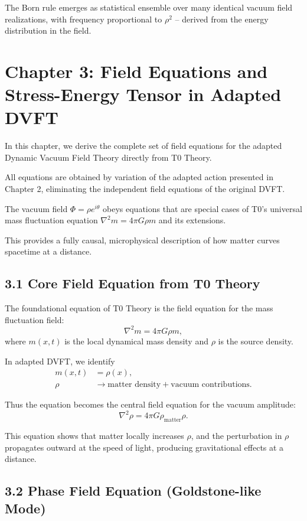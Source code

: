 	The Born rule emerges as statistical ensemble over many identical vacuum field realizations, with frequency proportional to $\rho^2$ – derived from the energy distribution in the field.
	
	\section{Chapter 3: Field Equations and Stress-Energy Tensor in Adapted DVFT}
	
	In this chapter, we derive the complete set of field equations for the adapted Dynamic Vacuum Field Theory directly from T0 Theory.
	
	All equations are obtained by variation of the adapted action presented in Chapter 2, eliminating the independent field equations of the original DVFT.
	
	The vacuum field $\Phi = \rho e^{i\theta}$ obeys equations that are special cases of T0's universal mass fluctuation equation $\nabla^2 m = 4\pi G \rho m$ and its extensions.
	
	This provides a fully causal, microphysical description of how matter curves spacetime at a distance.
	
	\subsection{3.1 Core Field Equation from T0 Theory}
	
	The foundational equation of T0 Theory is the field equation for the mass fluctuation field:
	\[
	\nabla^2 m = 4\pi G \rho m,
	\]
	where $m(x,t)$ is the local dynamical mass density and $\rho$ is the source density.
	
	In adapted DVFT, we identify
	\begin{align}
		m(x,t) &= \rho(x), \\
		\rho &\to \text{matter density} + \text{vacuum contributions}.
	\end{align}
	
	Thus the equation becomes the central field equation for the vacuum amplitude:
	\[
	\nabla^2 \rho = 4\pi G \rho_{\text{matter}} \rho.
	\]
	
	This equation shows that matter locally increases $\rho$, and the perturbation in $\rho$ propagates outward at the speed of light, producing gravitational effects at a distance.
	
	\subsection{3.2 Phase Field Equation (Goldstone-like Mode)}
	

